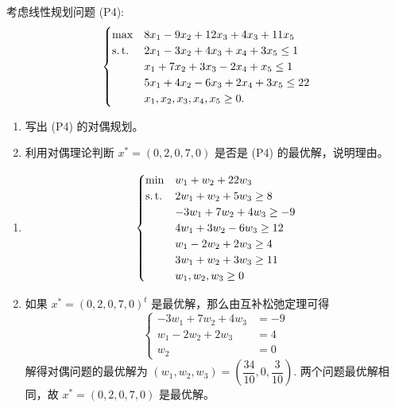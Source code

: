 \begin{Problem}
    考虑线性规划问题 (P4):
    \[
        \begin{cases}
            \max & 8x_1 - 9x_2 + 12x_3 + 4x_3 + 11x_5\\
            \operatorname{s.t.} &2x_1 - 3x_2 + 4x_3 + x_4 + 3x_5 \le 1\\
            &x_1 + 7x_2 + 3x_3 - 2x_4 + x_5 \le 1\\
            &5x_1 + 4x_2 - 6x_3 + 2x_4 + 3x_5 \le 22\\
            &x_1, x_2, x_3, x_4, x_5 \ge 0\text{.}
        \end{cases}
    \]
    \begin{enumerate}[label=(\arabic*)]
        \item 写出 (P4) 的对偶规划。
        \item 利用对偶理论判断 $x^* = (0, 2, 0, 7, 0)$ 是否是 (P4) 的最优解，说明理由。
    \end{enumerate}

    \Answer 
    \leavevmode
    \begin{enumerate}[label=(\arabic*)]
        \item 
        \[
            \begin{cases}
                \min &w_1 + w_2 + 22w_3\\
                \operatorname{s.t.} &2w_1 + w_2 + 5w_3 \ge 8\\
                &-3w_1 + 7w_2 + 4w_3 \ge -9\\
                &4w_1 + 3w_2 - 6w_3 \ge 12\\
                &w_1 - 2w_2 + 2w_3 \ge 4\\
                &3w_1 + w_2 + 3w_3 \ge 11\\
                &w_1, w_2, w_3 \ge 0
            \end{cases}
        \]
        \item 如果 $x^* = (0, 2, 0, 7, 0)^t$ 是最优解，那么由互补松弛定理可得 
        \[
            \begin{cases}
                -3w_1 + 7w_2 + 4w_3 &= -9\\
                w_1 - 2w_2 + 2w_3 &= 4\\
                w_2 &= 0
            \end{cases}
        \]
        解得对偶问题的最优解为 $(w_1, w_2, w_3) = \left(\dfrac{34}{10}, 0, \dfrac{3}{10}\right)$. 两个问题最优解相同，故 $x^* = (0, 2, 0, 7, 0)$ 是最优解。
    \end{enumerate}
\end{Problem}

